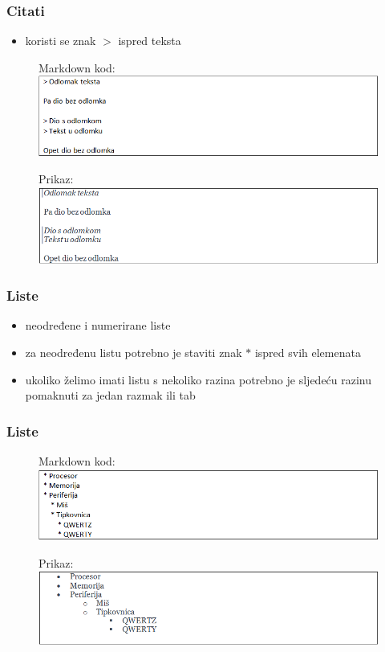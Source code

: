 \documentclass{beamer}
\begin{document}
\newpage

\begin{frame}
\frametitle{Citati}
\begin{itemize}
\item koristi se znak $>$ ispred teksta
\end{itemize}
\begin{figure}
{Markdown kod:}
\includegraphics[width = 1.0\linewidth]{Citati.png}
\end{figure}

\begin{figure}
{Prikaz:}
\includegraphics[width = 1.0\linewidth]{Citati_prikaz.png}
\end{figure}
\end{frame}

\newpage
\begin{frame}
\frametitle{Liste}
\begin{itemize}
\item neodređene i numerirane liste
\item za neodređenu listu potrebno je staviti znak $*$ ispred svih elemenata
\item ukoliko želimo imati listu s nekoliko razina potrebno je sljedeću razinu pomaknuti za jedan razmak ili tab
\end{itemize}
\end{frame}

\newpage
\begin{frame}
\frametitle{Liste}
\begin{figure}
{Markdown kod:}
\includegraphics[width = 1.0\linewidth]{Neuredene_liste.png}
\end{figure}

\begin{figure}
{Prikaz:}
\includegraphics[width = 1.0\linewidth]{Neuredene_liste_prikaz.png}
\end{figure}
\end{frame}
\end{document}

